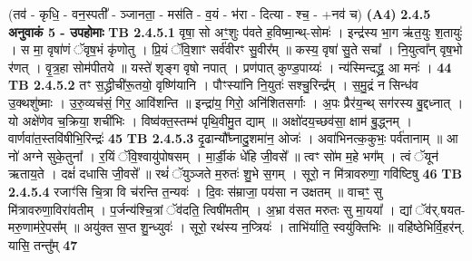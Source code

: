 \documentclass[17pt]{extarticle}
\begin{document}
                  \newline
                                    (तव॑ - कृधि॒ - वन॒स्पती᳚ - ञ्जानता॒ - मस॑ति - व॒यं - भ॑रा - दित्या - श्च॒ - +नव॑ च) \textbf{(A4)} \newline \newline
                \textbf{ 2.4.5      अनुवाकं   5 - उपहोमाः} \newline
                                \textbf{ TB 2.4.5.1} \newline
                  वृषा॒ सो अꣳ॒॒शुः प॑वते ह॒विष्मा॒न्थ्-सोमः॑ । इन्द्र॑स्य भा॒ग ऋ॑त॒युः श॒तायुः॑ । स मा॒ वृषा॑णं ॅवृष॒भं कृ॑णोतु । प्रि॒यं ॅवि॒शाꣳ सर्व॑वीरꣳ सु॒वीर᳚म् ॥ कस्य॒ वृषा॑ सु॒ते सचा᳚ । नि॒युत्वा᳚न् वृष॒भो र॑णत् । वृ॒त्र॒हा सोम॑पीतये ॥ यस्ते॑ शृङ्ग वृषो नपात् । प्रण॑पात् कुण्ड॒पाय्यः॑ । न्य॑स्मिन्दद्ध्र॒ आ मनः॑ । \textbf{ 44} \newline
                  \newline
                                \textbf{ TB 2.4.5.2} \newline
                  तꣳ स॒द्ध्रीची॑रू॒तयो॒ वृष्णि॑यानि । पौꣳस्या॑नि नि॒युतः॑ सश्चु॒रिन्द्र᳚म् । स॒मु॒द्रं न सिन्ध॑व उ॒क्थशु॑ष्माः । उ॒रु॒व्यच॑सं॒ गिर॒ आवि॑शन्ति ॥ इन्द्रा॑य॒ गिरो॒ अनि॑शितसर्गाः । अ॒पः प्रैर॑य॒न्थ् सग॑रस्य बु॒द्दध्नात् । यो अक्षे॑णेव च॒क्रिया॒ शची॑भिः । विष्व॑क्त॒स्तम्भ॑ पृथि॒वीमु॒त द्याम् ॥ अक्षो॑दय॒च्छव॑सा॒ क्षाम॑ बु॒द्ध्नम् । वार्णवा॑त॒स्तवि॑षीभि॒रिन्द्रः॑ \textbf{ 45} \newline
                  \newline
                                \textbf{ TB 2.4.5.3} \newline
                  दृ॒ढान्यौ᳚घ्नादु॒शमा॑न॒ ओजः॑ । अवा॑भिनत्क॒कुभः॒ पर्व॑तानाम् ॥ आ नो॑ अग्ने सुके॒तुना᳚ । र॒यिं ॅवि॒श्वायु॑पोषसम् । मा॒र्डी॒कं धे॑हि जी॒वसे᳚ ॥ त्वꣳ सो॑म म॒हे भग᳚म् । त्वं ॅयून॑ ऋताय॒ते । दक्षं॑ दधासि जी॒वसे᳚ ॥ रथं॑ ॅयुञ्जते म॒रुतः॑ शु॒भे स॒गम् । सूरो॒ न मि॑त्रावरुणा॒ गवि॑ष्टिषु \textbf{ 46} \newline
                  \newline
                                \textbf{ TB 2.4.5.4} \newline
                  रजाꣳ॑सि चि॒त्रा वि च॑रन्ति त॒न्यवः॑ । दि॒वः स॑म्राजा॒ पय॑सा न उक्षतम् ॥ वाचꣳ॒॒ सु मि॑त्रावरुणा॒विरा॑वतीम् । प॒र्जन्य॑श्चि॒त्रां ॅव॑दति॒ त्विषी॑मतीम् । अ॒भ्रा व॑सत मरुतः सु मा॒यया᳚ । द्यां ॅव॑र्.षयत-मरु॒णाम॑रे॒पस᳚म् ॥ अयु॑क्त स॒प्त शु॒न्ध्युवः॑ । सूरो॒ रथ॑स्य न॒प्त्रियः॑ । ताभि॑र्याति॒ स्वयु॑क्तिभिः ॥ वहि॑ष्ठेभिर्वि॒हर॑न्. यासि॒ तन्तु᳚म् \textbf{ 47} \newline
\end{document}
